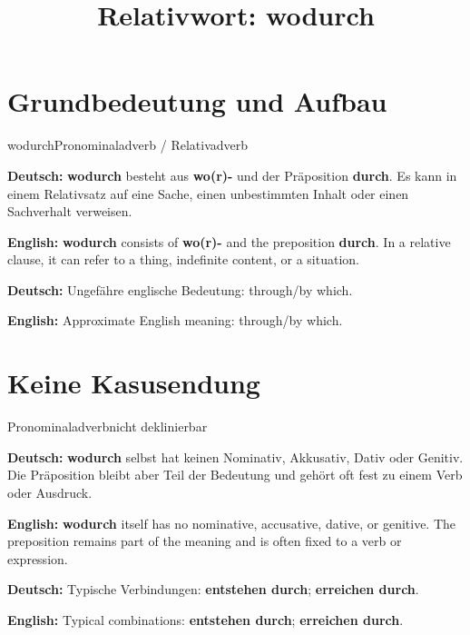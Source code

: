\documentclass[a4paper,11pt]{article}
\title{Relativwort: \glqq wodurch\grqq{}}
\date{}
\newcommand{\GermanText}[1]{\textbf{Deutsch: }#1\par}
\newcommand{\EnglishText}[1]{{\small\color{SoftGray}\textbf{English: }#1\par}}
\begin{document}
\maketitle

\tableofcontents

\newpage

\section{Grundbedeutung und Aufbau}

\begin{grammarentry}{wodurch}{Pronominaladverb / Relativadverb}

\GermanText{\textbf{wodurch} besteht aus \textbf{wo(r)-} und der Präposition \textbf{durch}. Es kann in einem Relativsatz auf eine Sache, einen unbestimmten Inhalt oder einen Sachverhalt verweisen.}

\EnglishText{\textbf{wodurch} consists of \textbf{wo(r)-} and the preposition \textbf{durch}. In a relative clause, it can refer to a thing, indefinite content, or a situation.}

\GermanText{Ungefähre englische Bedeutung: \glqq through/by which\grqq{}.}

\EnglishText{Approximate English meaning: \glqq through/by which\grqq{}.}

\end{grammarentry}

\section{Keine Kasusendung}

\begin{grammarentry}{Pronominaladverb}{nicht deklinierbar}

\GermanText{\textbf{wodurch} selbst hat keinen Nominativ, Akkusativ, Dativ oder Genitiv. Die Präposition bleibt aber Teil der Bedeutung und gehört oft fest zu einem Verb oder Ausdruck.}

\EnglishText{\textbf{wodurch} itself has no nominative, accusative, dative, or genitive. The preposition remains part of the meaning and is often fixed to a verb or expression.}

\GermanText{Typische Verbindungen: \textbf{entstehen durch}; \textbf{erreichen durch}.}

\EnglishText{Typical combinations: \textbf{entstehen durch}; \textbf{erreichen durch}.}

\end{grammarentry}
\end{document}

